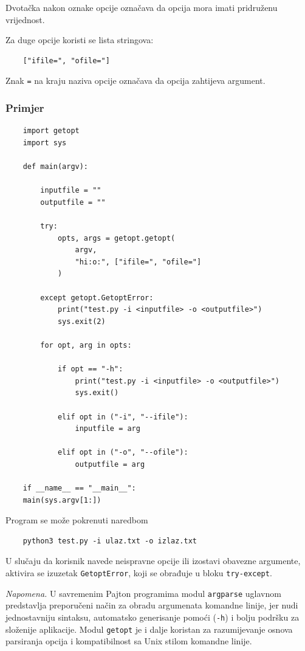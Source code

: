 Dvotačka nakon oznake opcije označava da opcija mora imati pridruženu vrijednost.

Za duge opcije koristi se lista stringova:

\begin{verbatim}
	["ifile=", "ofile="]
\end{verbatim}

Znak \texttt{=} na kraju naziva opcije označava da opcija zahtijeva argument.

\subsubsection*{Primjer}

\begin{verbatim}
	import getopt
	import sys
	
	def main(argv):
	
	    inputfile = ""
	    outputfile = ""
	
	    try:
	        opts, args = getopt.getopt(
	            argv,
	            "hi:o:", ["ifile=", "ofile="]
	        )
	
	    except getopt.GetoptError:
	        print("test.py -i <inputfile> -o <outputfile>")
	        sys.exit(2)
	
	    for opt, arg in opts:
	
	        if opt == "-h": 
	            print("test.py -i <inputfile> -o <outputfile>")
	            sys.exit()
	
	        elif opt in ("-i", "--ifile"):
	            inputfile = arg
	
	        elif opt in ("-o", "--ofile"):
                outputfile = arg
	
	if __name__ == "__main__":
	main(sys.argv[1:])
\end{verbatim}

Program se može pokrenuti naredbom

\begin{verbatim}
	python3 test.py -i ulaz.txt -o izlaz.txt
\end{verbatim}

 
U slučaju da korisnik navede neispravne opcije ili izostavi obavezne argumente, aktivira se izuzetak \texttt{GetoptError}, koji se obrađuje u bloku \texttt{try-except}.

\bigskip

\textit{Napomena.} U savremenim Pajton programima modul \texttt{argparse} uglavnom predstavlja preporučeni način za obradu argumenata komandne linije, jer nudi jednostavniju sintaksu, automatsko generisanje pomoći (\texttt{-h}) i bolju podršku za složenije aplikacije. Modul \texttt{getopt} je i dalje koristan za razumijevanje osnova parsiranja opcija i kompatibilnost sa Unix stilom komandne linije.



